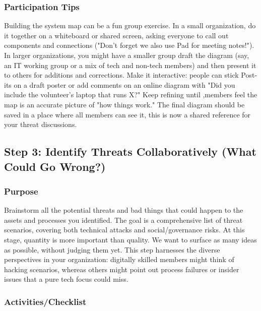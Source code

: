\subsubsection{Participation Tips}

Building the system map can be a fun group exercise. In a small organization, do it
together on a whiteboard or shared screen, asking everyone to call out
components and connections ("Don't forget we also use Pad for meeting notes!").
In larger organizations, you might have a smaller group draft the diagram (say, an IT
working group or a mix of tech and non-tech members) and then present it to
others for additions and corrections. Make it interactive: people can stick
Post-its on a draft poster or add comments on an online diagram with "Did you
include the volunteer's laptop that runs X?" Keep refining until ,members feel
the map is an accurate picture of "how things work." The final diagram should be
saved in a place where all members can see it, this is now a shared reference
for your threat discussions.

\subsection{Step 3: Identify Threats Collaboratively (What Could Go Wrong?)}
\label{subsec:Step3}

\subsubsection{Purpose}

Brainstorm all the potential threats and bad things that could happen to the
assets and processes you identified. The goal is a comprehensive list of threat
scenarios, covering both technical attacks and social/governance risks. At this
stage, quantity is more important than quality. We want to surface as many
ideas as possible, without judging them yet. This step harnesses the diverse
perspectives in your organization: digitally skilled members might think
of hacking scenarios, whereas others might point out process failures or insider
issues that a pure tech focus could miss.

\subsubsection{Activities/Checklist}

